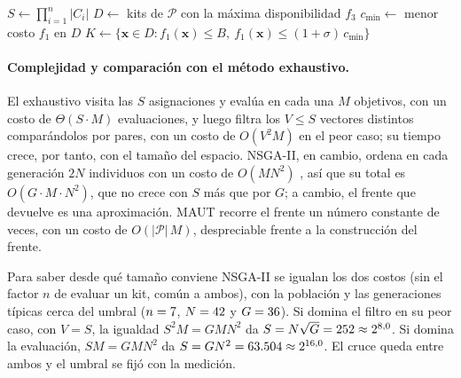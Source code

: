 \begin{algorithm}[!htb]
\caption{Construcción del frente y selección del kit recomendado}
\label{alg:frente-maut}
$S \leftarrow \prod_{i=1}^{n}|C_i|$\;
$D\leftarrow$ kits de $\mathcal{P}$ con la máxima disponibilidad $f_3$ 
$c_{\min}\leftarrow$ menor costo $f_1$ en $D$\;
$K\leftarrow\{\mathbf{x}\in D : f_1(\mathbf{x})\leq B,\ f_1(\mathbf{x})\leq(1+\sigma)\,c_{\min}\}$\;
 
\end{algorithm}

\paragraph{Complejidad y comparación con el método exhaustivo.} El exhaustivo visita las $S$
asignaciones y evalúa en cada una $M$ objetivos, con un costo de $\Theta(S\cdot M)$ evaluaciones, y
luego filtra los $V\leq S$ vectores distintos comparándolos por pares, con un costo de $O(V^2M)$ en
el peor caso; su tiempo crece, por tanto, con el tamaño del espacio. NSGA-II, en cambio, ordena en
cada generación $2N$ individuos con un costo de $O(MN^2)$ \citep{deb_fast_2002}, así que su
total es $O(G\cdot M\cdot N^2)$, que no crece con $S$ más que por $G$; a cambio, el frente que devuelve es una
aproximación. MAUT recorre el frente un número constante de veces, con un costo de
$O(|\mathcal{P}|\,M)$, despreciable frente a la construcción del frente.

Para saber desde qué tamaño conviene NSGA-II se igualan los dos costos (sin el factor $n$ de
evaluar un kit, común a ambos), con la población y las generaciones típicas cerca del umbral ($n=7$, $N=42$ y $G=36$). Si
domina el filtro en su peor caso, con $V=S$, la igualdad $S^2M=GMN^2$ da $S=N\sqrt{G}=252\approx
2^{8{,}0}$. Si domina la evaluación, $SM=GMN^2$ da $S=GN^2=63.504\approx 2^{16{,}0}$.
El cruce queda entre ambos y el umbral se fijó con la medición.

